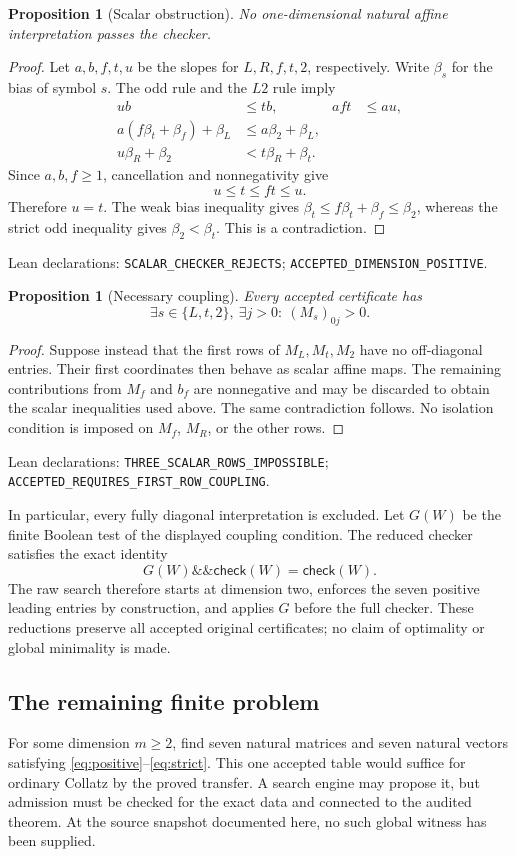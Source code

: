 \documentclass[11pt,a4paper]{article}
\newtheorem{proposition}[theorem]{Proposition}
\theoremstyle{definition}
\newcommand{\chk}{\mathsf{check}}
\newcommand{\name}[1]{{\small\texttt{#1}}}
\newcommand{\source}[1]{\par{\footnotesize\color{ink}Lean declarations: #1.}\par}
\begin{document}
\begin{proposition}[Scalar obstruction]
No one-dimensional natural affine interpretation passes the checker.
\end{proposition}
\begin{proof}
Let $a,b,f,t,u$ be the slopes for $L,R,f,t,2$, respectively.
Write $\beta_s$ for the bias of symbol $s$.
The odd rule and the $L2$ rule imply
\begin{align*}
 ub&\le tb,& aft&\le au,\\
 a(f\beta_t+\beta_f)+\beta_L&\le a\beta_2+\beta_L,\\
 u\beta_R+\beta_2&<t\beta_R+\beta_t.
\end{align*}
Since $a,b,f\ge1$, cancellation and nonnegativity give
\[
 u\le t\le ft\le u.
\]
Therefore $u=t$. The weak bias inequality gives
$\beta_t\le f\beta_t+\beta_f\le\beta_2$, whereas the strict odd inequality
gives $\beta_2<\beta_t$. This is a contradiction.
\end{proof}
\source{\name{SCALAR\_CHECKER\_REJECTS};
\name{ACCEPTED\_DIMENSION\_POSITIVE}}

\begin{proposition}[Necessary coupling]
Every accepted certificate has
\[
 \exists s\in\{L,t,2\},\ \exists j>0:\ (M_s)_{0j}>0.
\]
\end{proposition}
\begin{proof}
Suppose instead that the first rows of $M_L,M_t,M_2$ have no off-diagonal
entries. Their first coordinates then behave as scalar affine maps.
The remaining contributions from $M_f$ and $b_f$ are nonnegative and may
be discarded to obtain the scalar inequalities used above. The same
contradiction follows. No isolation condition is imposed on $M_f$, $M_R$,
or the other rows.
\end{proof}
\source{\name{THREE\_SCALAR\_ROWS\_IMPOSSIBLE};
\name{ACCEPTED\_REQUIRES\_FIRST\_ROW\_COUPLING}}

In particular, every fully diagonal interpretation is excluded.
Let $G(W)$ be the finite Boolean test of the displayed coupling condition.
The reduced checker satisfies the exact identity
\[
 G(W)\mathbin{\&\&}\chk(W)=\chk(W).
\]
The raw search therefore starts at dimension two, enforces the seven positive
leading entries by construction, and applies $G$ before the full checker.
These reductions preserve all accepted original certificates; no claim of
optimality or global minimality is made.

\subsection*{The remaining finite problem}
For some dimension $m\ge2$, find seven natural matrices and seven natural
vectors satisfying \eqref{eq:positive}--\eqref{eq:strict}. This one accepted
table would suffice for ordinary Collatz by the proved transfer.
A search engine may propose it, but admission must be checked for the exact
data and connected to the audited theorem. At the source snapshot documented
here, no such global witness has been supplied.
\end{document}

